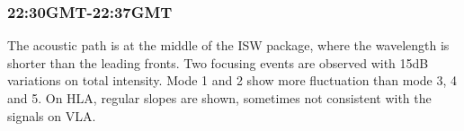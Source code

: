 \subsubsection{22:30GMT-22:37GMT}
The acoustic path is at the middle of the ISW package, where the
wavelength is shorter than the leading fronts. Two focusing events
are observed with 15dB variations on total intensity. Mode 1 and 2
show more fluctuation than mode 3, 4 and 5. On HLA, regular slopes
are shown, sometimes not consistent with the signals on VLA.
